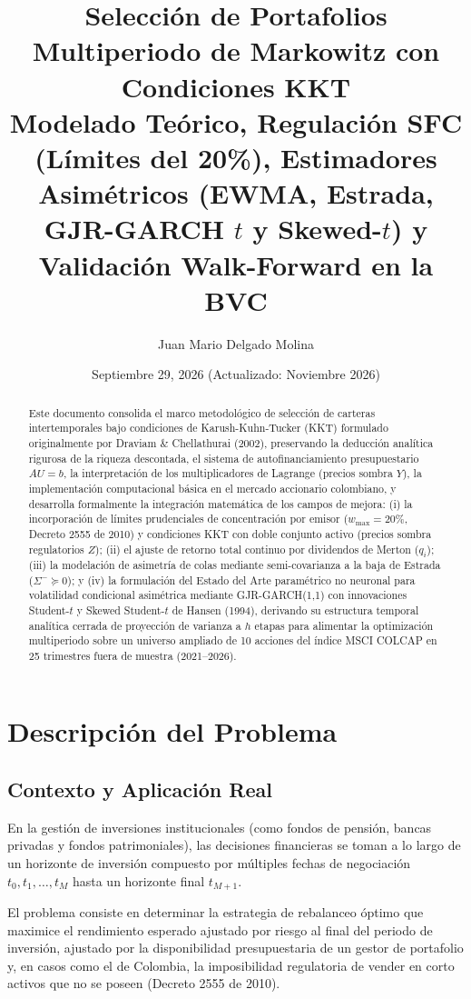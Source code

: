 \documentclass[11pt,a4paper]{article}
\title{Selección de Portafolios Multiperiodo de Markowitz con Condiciones KKT\\
\large Modelado Teórico, Regulación SFC (Límites del 20\%), Estimadores Asimétricos (EWMA, Estrada, GJR-GARCH $t$ y Skewed-$t$) y Validación Walk-Forward en la BVC}
\author{Juan Mario Delgado Molina}
\date{Septiembre 29, 2026 (Actualizado: Noviembre 2026)}
\begin{document}
\maketitle

\begin{abstract}
Este documento consolida el marco metodológico de selección de carteras intertemporales bajo condiciones de Karush-Kuhn-Tucker (KKT) formulado originalmente por Draviam \& Chellathurai (2002), preservando la deducción analítica rigurosa de la riqueza descontada, el sistema de autofinanciamiento presupuestario $AU = b$, la interpretación de los multiplicadores de Lagrange (precios sombra $Y$), la implementación computacional básica en el mercado accionario colombiano, y desarrolla formalmente la integración matemática de los campos de mejora: (i) la incorporación de límites prudenciales de concentración por emisor ($w_{\max} = 20\%$, Decreto 2555 de 2010) y condiciones KKT con doble conjunto activo (precios sombra regulatorios $Z$); (ii) el ajuste de retorno total continuo por dividendos de Merton ($q_i$); (iii) la modelación de asimetría de colas mediante semi-covarianza a la baja de Estrada ($\Sigma^- \succeq 0$); y (iv) la formulación del Estado del Arte paramétrico no neuronal para volatilidad condicional asimétrica mediante GJR-GARCH(1,1) con innovaciones Student-$t$ y Skewed Student-$t$ de Hansen (1994), derivando su estructura temporal analítica cerrada de proyección de varianza a $h$ etapas para alimentar la optimización multiperiodo sobre un universo ampliado de 10 acciones del índice MSCI COLCAP en 25 trimestres fuera de muestra (2021--2026).
\end{abstract}

\section{Descripción del Problema}

\subsection{Contexto y Aplicación Real}
En la gestión de inversiones institucionales (como fondos de pensión, bancas privadas y fondos patrimoniales), las decisiones financieras se toman a lo largo de un horizonte de inversión compuesto por múltiples fechas de negociación $t_0, t_1, \dots, t_M$ hasta un horizonte final $t_{M+1}$.

El problema consiste en determinar la estrategia de rebalanceo óptimo que maximice el rendimiento esperado ajustado por riesgo al final del periodo de inversión, ajustado por la disponibilidad presupuestaria de un gestor de portafolio y, en casos como el de Colombia, la imposibilidad regulatoria de vender en corto activos que no se poseen (Decreto 2555 de 2010).
\end{document}
